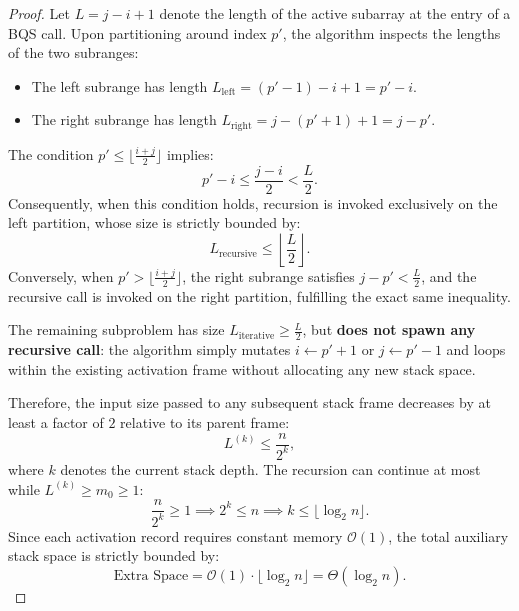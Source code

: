 \begin{proof}
Let $L = j - i + 1$ denote the length of the active subarray at the entry of a BQS call. Upon partitioning around index $p'$, the algorithm inspects the lengths of the two subranges:
\begin{itemize}
  \item The left subrange has length $L_{\text{left}} = (p' - 1) - i + 1 = p' - i$.
  \item The right subrange has length $L_{\text{right}} = j - (p' + 1) + 1 = j - p'$.
\end{itemize}
The condition $p' \le \lfloor \frac{i + j}{2} \rfloor$ implies:
\begin{equation}
  p' - i \le \frac{j - i}{2} < \frac{L}{2}.
\end{equation}
Consequently, when this condition holds, recursion is invoked exclusively on the left partition, whose size is strictly bounded by:
\begin{equation}
  L_{\text{recursive}} \le \left\lfloor \frac{L}{2} \right\rfloor.
\end{equation}
Conversely, when $p' > \lfloor \frac{i + j}{2} \rfloor$, the right subrange satisfies $j - p' < \frac{L}{2}$, and the recursive call is invoked on the right partition, fulfilling the exact same inequality.

The remaining subproblem has size $L_{\text{iterative}} \ge \frac{L}{2}$, but \textbf{does not spawn any recursive call}: the algorithm simply mutates $i \leftarrow p' + 1$ or $j \leftarrow p' - 1$ and loops within the existing activation frame without allocating any new stack space.

Therefore, the input size passed to any subsequent stack frame decreases by at least a factor of $2$ relative to its parent frame:
\begin{equation}
  L^{(k)} \le \frac{n}{2^k},
\end{equation}
where $k$ denotes the current stack depth. The recursion can continue at most while $L^{(k)} \ge m_0 \ge 1$:
\begin{equation}
  \frac{n}{2^k} \ge 1 \implies 2^k \le n \implies k \le \lfloor \log_2 n \rfloor.
\end{equation}
Since each activation record requires constant memory $\mathcal{O}(1)$, the total auxiliary stack space is strictly bounded by:
\begin{equation}
  \text{Extra Space} = \mathcal{O}(1) \cdot \lfloor \log_2 n \rfloor = \Theta(\log_2 n).
\end{equation}
\end{proof}

